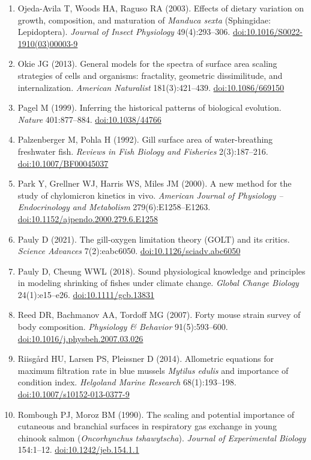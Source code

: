\begin{small}
\begin{enumerate}[label={},leftmargin=1.2em,itemindent=-1.2em,itemsep=0.15em]
\item Ojeda-Avila T, Woods HA, Raguso RA (2003). Effects of dietary variation on growth, composition, and maturation of \emph{Manduca sexta} (Sphingidae: Lepidoptera). \emph{Journal of Insect Physiology} 49(4):293–306. \href{https://doi.org/10.1016/S0022-1910(03)00003-9}{doi:10.1016/S0022-1910(03)00003-9}
\item Okie JG (2013). General models for the spectra of surface area scaling strategies of cells and organisms: fractality, geometric dissimilitude, and internalization. \emph{American Naturalist} 181(3):421–439. \href{https://doi.org/10.1086/669150}{doi:10.1086/669150}
\item Pagel M (1999). Inferring the historical patterns of biological evolution. \emph{Nature} 401:877–884. \href{https://doi.org/10.1038/44766}{doi:10.1038/44766}
\item Palzenberger M, Pohla H (1992). Gill surface area of water-breathing freshwater fish. \emph{Reviews in Fish Biology and Fisheries} 2(3):187–216. \href{https://doi.org/10.1007/BF00045037}{doi:10.1007/BF00045037}
\item Park Y, Grellner WJ, Harris WS, Miles JM (2000). A new method for the study of chylomicron kinetics in vivo. \emph{American Journal of Physiology – Endocrinology and Metabolism} 279(6):E1258–E1263. \href{https://doi.org/10.1152/ajpendo.2000.279.6.E1258}{doi:10.1152/ajpendo.2000.279.6.E1258}
\item Pauly D (2021). The gill-oxygen limitation theory (GOLT) and its critics. \emph{Science Advances} 7(2):eabc6050. \href{https://doi.org/10.1126/sciadv.abc6050}{doi:10.1126/sciadv.abc6050}
\item Pauly D, Cheung WWL (2018). Sound physiological knowledge and principles in modeling shrinking of fishes under climate change. \emph{Global Change Biology} 24(1):e15–e26. \href{https://doi.org/10.1111/gcb.13831}{doi:10.1111/gcb.13831}
\item Reed DR, Bachmanov AA, Tordoff MG (2007). Forty mouse strain survey of body composition. \emph{Physiology \& Behavior} 91(5):593–600. \href{https://doi.org/10.1016/j.physbeh.2007.03.026}{doi:10.1016/j.physbeh.2007.03.026}
\item Riisgård HU, Larsen PS, Pleissner D (2014). Allometric equations for maximum filtration rate in blue mussels \emph{Mytilus edulis} and importance of condition index. \emph{Helgoland Marine Research} 68(1):193–198. \href{https://doi.org/10.1007/s10152-013-0377-9}{doi:10.1007/s10152-013-0377-9}
\item Rombough PJ, Moroz BM (1990). The scaling and potential importance of cutaneous and branchial surfaces in respiratory gas exchange in young chinook salmon (\emph{Oncorhynchus tshawytscha}). \emph{Journal of Experimental Biology} 154:1–12. \href{https://doi.org/10.1242/jeb.154.1.1}{doi:10.1242/jeb.154.1.1}

\end{enumerate}
\end{small}
